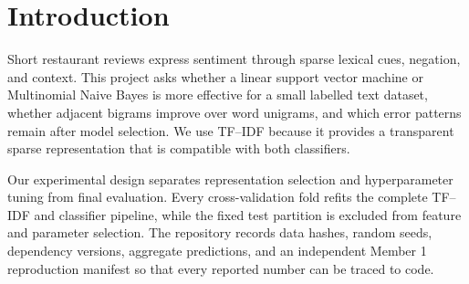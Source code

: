 \documentclass{article}
\begin{document}

\printAffiliationsAndNotice{}

\begin{abstract}
We study binary sentiment classification for a fixed public snapshot of 1,000
restaurant-review snippets. After removing four same-label duplicate rows, we
create one stratified 796/200 training/test split and compare word-unigram and
unigram--bigram TF--IDF representations without fitting vocabulary or inverse
document frequencies on validation or test text. Training-fold validation
selects word unigrams, Linear SVM with $C=0.1$, and Multinomial Naive Bayes with
$\alpha=0.5$. On the held-out test partition, Naive Bayes obtains F1 0.742 and
ROC--AUC 0.837, while Linear SVM obtains F1 0.720 and ROC--AUC 0.806. We report
data quality checks, model interpretation, and descriptive error categories,
and provide a fully reproducible code and notebook workflow.
\end{abstract}

\section{Introduction}

Short restaurant reviews express sentiment through sparse lexical cues,
negation, and context. This project asks whether a linear support vector
machine or Multinomial Naive Bayes is more effective for a small labelled text
dataset, whether adjacent bigrams improve over word unigrams, and which error
patterns remain after model selection. We use TF--IDF because it provides a
transparent sparse representation that is compatible with both classifiers.

Our experimental design separates representation selection and hyperparameter
tuning from final evaluation. Every cross-validation fold refits the complete
TF--IDF and classifier pipeline, while the fixed test partition is excluded
from feature and parameter selection. The repository records data hashes,
random seeds, dependency versions, aggregate predictions, and an independent
Member 1 reproduction manifest so that every reported number can be traced to
code.
\end{document}
